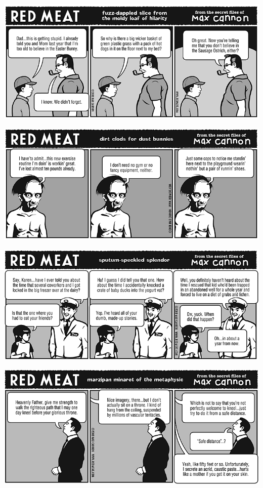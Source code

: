 \documentclass[a4paper,twoside,11pt]{article}
\begin{document}
\includegraphics[width=\textwidth]{redmeat_2008-07-01.png}



\includegraphics[width=\textwidth]{redmeat_2008-07-08.png}



\includegraphics[width=\textwidth]{redmeat_2008-07-15.png}



\includegraphics[width=\textwidth]{redmeat_2008-07-22.png}
\end{document}
